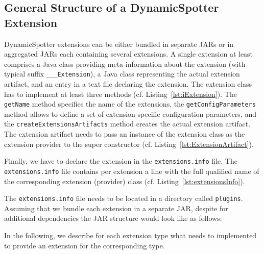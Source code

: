 \documentclass{report}
\newcommand{\DS}{DynamicSpotter }
\begin{document}
\subsection{General Structure of a \DS Extension}
\label{sec:extensionsGeneralStructure}
\DS extensions can be either bundled in separate JARs or in aggregated JARs each containing several extensions.
A single extension at least comprises a Java class providing meta-information about the extension (with typical suffix
\texttt{\_\_\_Extension}), a Java class representing the actual extension artifact, and an entry in a text file
declaring the extension. The extension class has to implement at least three methods (cf.
Listing~\ref{lst:iExtension}). 
 The \texttt{getName} method specifies the name of the extensions, the \texttt{getConfigParameters} method allows to define a set of extension-specific configuration parameters, and the
\texttt{createExtensionsArtifacts} method creates the actual extension artifact. The extension artifact needs to
pass an instance of the extension class as the extension provider to the super constructor (cf.
Listing~\ref{lst:ExtensionArtifact}).

Finally, we have to declare the extension in the \texttt{extensions.info} file. The \texttt{extensions.info} file
contains per extension a line with the full qualified name of the corresponding extension (provider) class (cf.
Listing~\ref{lst:extensionsInfo}).

The \texttt{extensions.info} file needs to be located in a directory called \texttt{plugins}.
Assuming that we bundle each extension in a separate JAR, despite for additional dependencies the JAR structure would
look like as follows:

In the following, we describe for each extension type what needs to implemented to provide an extension for the
corresponding type.
\end{document}
